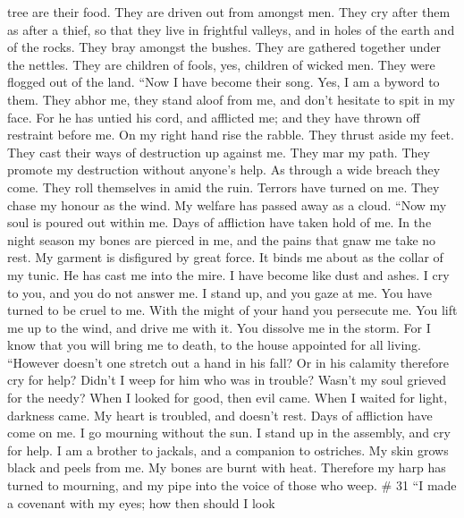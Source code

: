 tree are their food.  They are driven out from amongst men.
They cry after them as after a thief,  so that they live in
frightful valleys, and in holes of the earth and of the rocks.
 They bray amongst the bushes. They are gathered together
under the nettles.  They are children of fools, yes,
children of wicked men. They were flogged out of the land. 
``Now I have become their song. Yes, I am a byword to them.
 They abhor me, they stand aloof from me, and don't
hesitate to spit in my face.  For he has untied his cord,
and afflicted me; and they have thrown off restraint before me.
 On my right hand rise the rabble. They thrust aside my
feet. They cast their ways of destruction up against me. 
They mar my path. They promote my destruction without anyone's help.
 As through a wide breach they come. They roll themselves
in amid the ruin.  Terrors have turned on me. They chase my
honour as the wind. My welfare has passed away as a cloud. 
``Now my soul is poured out within me. Days of affliction have taken
hold of me.  In the night season my bones are pierced in
me, and the pains that gnaw me take no rest.  My garment is
disfigured by great force. It binds me about as the collar of my tunic.
 He has cast me into the mire. I have become like dust and
ashes.  I cry to you, and you do not answer me. I stand up,
and you gaze at me.  You have turned to be cruel to me.
With the might of your hand you persecute me.  You lift me
up to the wind, and drive me with it. You dissolve me in the storm.
 For I know that you will bring me to death, to the house
appointed for all living.  ``However doesn't one stretch
out a hand in his fall? Or in his calamity therefore cry for help?
 Didn't I weep for him who was in trouble? Wasn't my soul
grieved for the needy?  When I looked for good, then evil
came. When I waited for light, darkness came.  My heart is
troubled, and doesn't rest. Days of affliction have come on me.
 I go mourning without the sun. I stand up in the assembly,
and cry for help.  I am a brother to jackals, and a
companion to ostriches.  My skin grows black and peels from
me. My bones are burnt with heat.  Therefore my harp has
turned to mourning, and my pipe into the voice of those who weep. \# 31
 ``I made a covenant with my eyes; how then should I look
